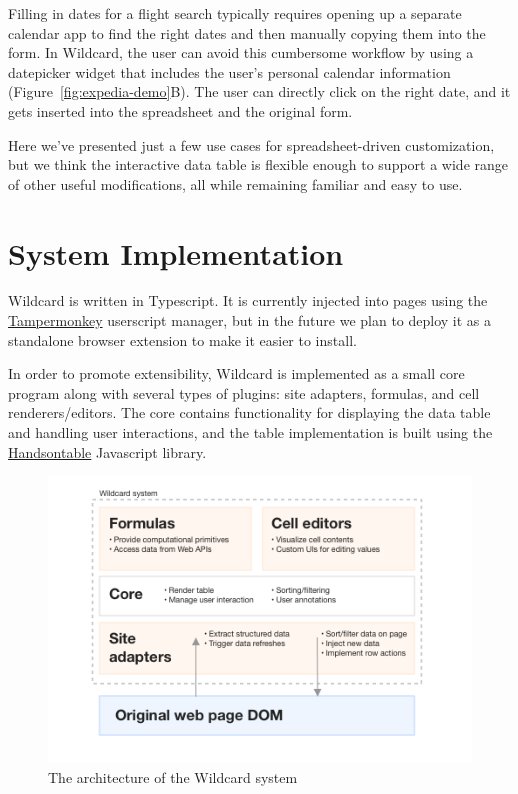 \documentclass[english,submission]{programming}
\begin{document}
Filling in dates for a flight search typically requires opening up a
separate calendar app to find the right dates and then manually copying
them into the form. In Wildcard, the user can avoid this cumbersome
workflow by using a datepicker widget that includes the user's personal
calendar information{ (Figure~\ref{fig:expedia-demo}B)}. The user can
directly click on the right date, and it gets inserted into the
spreadsheet and the original form.

Here we've presented just a few use cases for spreadsheet-driven
customization, but we think the interactive data table is flexible
enough to support a wide range of other useful modifications, all while
remaining familiar and easy to use.

\hypertarget{sec:implementation}{%
\section{System Implementation}\label{sec:implementation}}

Wildcard is written in Typescript. It is currently injected into pages
using the \href{https://www.tampermonkey.net/}{Tampermonkey} userscript
manager, but in the future we plan to deploy it as a standalone browser
extension to make it easier to install.

In order to promote extensibility, Wildcard is implemented as a small
core program along with several types of plugins: site adapters,
formulas, and cell renderers/editors. The core contains functionality
for displaying the data table and handling user interactions, and the
table implementation is built using the
\href{https://handsontable.com/}{Handsontable} Javascript library.

\begin{figure}
\hypertarget{fig:architecture}{%
\centering
\includegraphics{media/architecture-clean.png}
\caption{The architecture of the Wildcard
system}\label{fig:architecture}
}
\end{figure}
\end{document}
